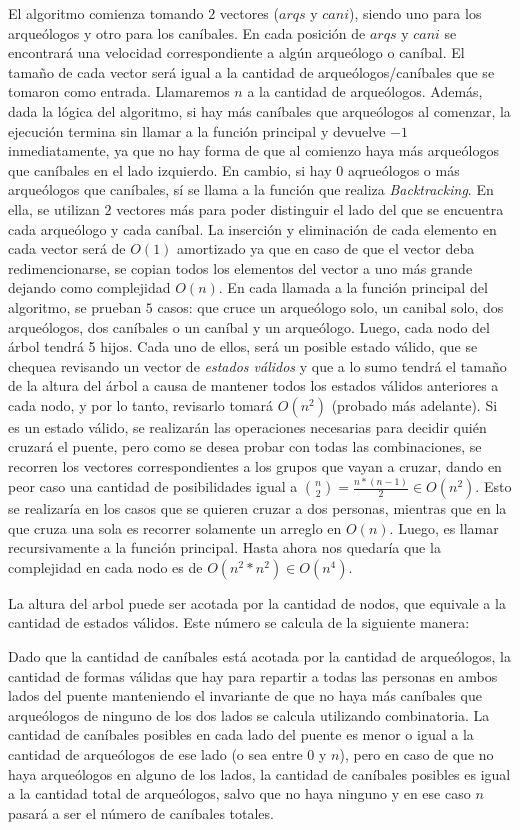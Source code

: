       El algoritmo comienza tomando $2$ vectores ($arqs$ y $cani$), siendo uno para los arqueólogos y otro para los caníbales. En cada posición de $arqs$ y $cani$ se encontrará una velocidad correspondiente a algún arqueólogo o caníbal. El tamaño de cada vector será igual a la cantidad de arqueólogos/caníbales que se tomaron como entrada. Llamaremos $n$ a la cantidad de arqueólogos. Además, dada la lógica del algoritmo, si hay más caníbales que arqueólogos al comenzar, la ejecución termina sin llamar a la función principal y devuelve $-1$ inmediatamente, ya que no hay forma de que al comienzo haya más arqueólogos que caníbales en el lado izquierdo. En cambio, si hay $0$ aqrueólogos o más arqueólogos que caníbales, sí se llama a la función que realiza \emph{Backtracking}.
      En ella, se utilizan $2$ vectores más para poder distinguir el lado del que se encuentra cada arqueólogo y cada caníbal. La inserción y eliminación de cada elemento en cada vector será de $O(1)$ amortizado ya que en caso de que el vector deba redimencionarse, se copian todos los elementos del vector a uno más grande dejando como complejidad $O(n)$.
      En cada llamada a la función principal del algoritmo, se prueban $5$ casos: que cruce un arqueólogo solo, un canibal solo, dos arqueólogos, dos caníbales o un caníbal y un arqueólogo. Luego, cada nodo del árbol tendrá 5 hijos. Cada uno de ellos, será un posible estado válido, que se chequea revisando un vector de \emph{estados válidos} y que a lo sumo tendrá el tamaño de la altura del árbol a causa de mantener todos los estados válidos anteriores a cada nodo, y por lo tanto, revisarlo tomará $O(n^2)$ (probado más adelante). Si es un estado válido, se realizarán las operaciones necesarias para decidir quién cruzará el puente, pero como se desea probar con todas las combinaciones, se recorren los vectores correspondientes a los grupos que vayan a cruzar, dando en peor caso una cantidad de posibilidades igual a $\binom{n}{2} = \frac{n*(n-1)}{2} \in O(n^2)$. Esto se realizaría en los casos que se quieren cruzar a dos personas, mientras que en la que cruza una sola es recorrer solamente un arreglo en $O(n)$. Luego, es llamar recursivamente a la función principal. Hasta ahora nos quedaría que la complejidad en cada nodo es de $O(n^2 * n^2) \in O(n^4)$.

      La altura del arbol puede ser acotada por la cantidad de nodos, que equivale a la cantidad de estados válidos. Este número se calcula de la siguiente manera:

      Dado que la cantidad de caníbales está acotada por la cantidad de arqueólogos, la cantidad de formas válidas que hay para repartir a todas las personas en ambos lados del puente manteniendo el invariante de que no haya más caníbales que arqueólogos de ninguno de los dos lados se calcula utilizando combinatoria. La cantidad de caníbales posibles en cada lado del puente es menor o igual a la cantidad de arqueólogos de ese lado (o sea entre $0$ y $n$), pero en caso de que no haya arqueólogos en alguno de los lados, la cantidad de caníbales posibles es igual a la cantidad total de arqueólogos, salvo que no haya ninguno y en ese caso $n$ pasará a ser el número de caníbales totales.

